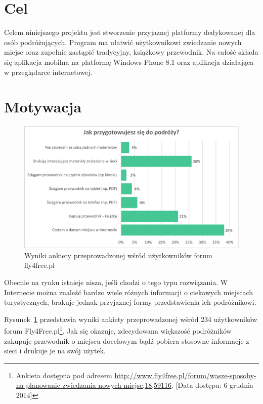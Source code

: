 \documentclass{book}
\begin{document}
		\section{Cel}
		Celem niniejszego projektu jest stworzenie przyjaznej platformy dedykowanej dla osób podróżujących. Program ma ułatwić użytkownikowi zwiedzanie nowych miejsc oraz zupełnie zastąpić tradycyjny, książkowy przewodnik. Na całość składa się aplikacja mobilna na platformę Windows Phone 8.1 oraz aplikacja działająca w przeglądarce internetowej. 

		\section{Motywacja}
	
		\begin{figure}		
			\centering
			\includegraphics[width=1.0\textwidth]{fly4freeAnkieta.pdf}
			\caption{Wyniki ankiety przeprowadzonej wśród użytkowników forum fly4free.pl}
			\label{fig:fly4freeAnkieta}
		\end{figure}
	
		Obecnie na rynku istnieje nisza, jeśli chodzi o tego typu rozwiązania. W Internecie można znaleźć bardzo wiele różnych informacji o ciekawych miejscach turystycznych, brakuje jednak przyjaznej formy przedstawienia ich podróżnikowi. 
		
		Rysunek~\ref{fig:fly4freeAnkieta} przedstawia wyniki ankiety przeprowadzonej wśród 234 użytkowników forum Fly4Free.pl\footnote{Ankieta dostępna pod adresem \url{http://www.fly4free.pl/forum/wasze-sposoby-na-planowanie-zwiedzania-nowych-miejsc,18,59116}. [Data dostępu: 6 grudnia 2014]}. Jak się okazuje, zdecydowana większość podróżników zakupuje przewodnik o miejscu docelowym bądź pobiera stosowne informacje z sieci i drukuje je na swój użytek.
		
\end{document}
